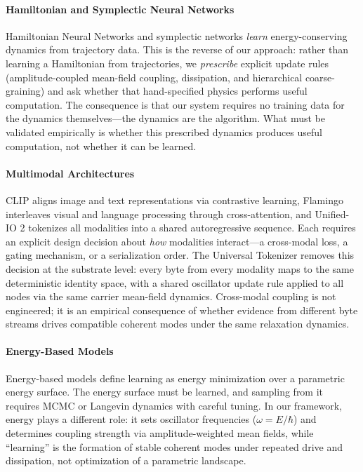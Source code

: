 \documentclass[11pt,a4paper]{article}
\begin{document}
\paragraph{Hamiltonian and Symplectic Neural Networks}
Hamiltonian Neural Networks \citep{greydanus2019hamiltonian} and symplectic networks \citep{chen2020symplectic, jin2020sympnets} \emph{learn} energy-conserving dynamics from trajectory data. This is the reverse of our approach: rather than learning a Hamiltonian from trajectories, we \emph{prescribe} explicit update rules (amplitude-coupled mean-field coupling, dissipation, and hierarchical coarse-graining) and ask whether that hand-specified physics performs useful computation. The consequence is that our system requires no training data for the dynamics themselves---the dynamics are the algorithm. What must be validated empirically is whether this prescribed dynamics produces useful computation, not whether it can be learned.

\paragraph{Multimodal Architectures}
CLIP \citep{radford2021learning} aligns image and text representations via contrastive learning, Flamingo \citep{alayrac2022flamingo} interleaves visual and language processing through cross-attention, and Unified-IO 2 \citep{lu2024unifiedio2} tokenizes all modalities into a shared autoregressive sequence. Each requires an explicit design decision about \emph{how} modalities interact---a cross-modal loss, a gating mechanism, or a serialization order. The Universal Tokenizer removes this decision at the substrate level: every byte from every modality maps to the same deterministic identity space, with a shared oscillator update rule applied to all nodes via the same carrier mean-field dynamics. Cross-modal coupling is not engineered; it is an empirical consequence of whether evidence from different byte streams drives compatible coherent modes under the same relaxation dynamics.

\paragraph{Energy-Based Models}
Energy-based models \citep{lecun2006tutorial, du2021improved} define learning as energy minimization over a parametric energy surface. The energy surface must be learned, and sampling from it requires MCMC or Langevin dynamics with careful tuning. In our framework, energy plays a different role: it sets oscillator frequencies (\(\omega=E/\hbar\)) and determines coupling strength via amplitude-weighted mean fields, while ``learning'' is the formation of stable coherent modes under repeated drive and dissipation, not optimization of a parametric landscape.
\end{document}
